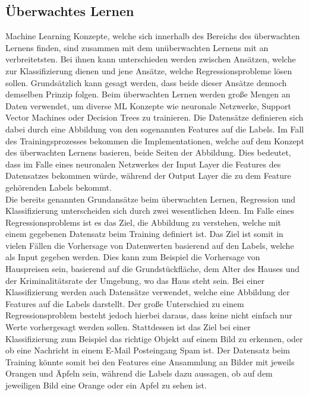 \documentclass[]{iat}
\begin{document}
\subsection{Überwachtes Lernen} \label{sec:ueberwachtes_lernen}
Machine Learning Konzepte, welche sich innerhalb des Bereichs des überwachten Lernens finden, sind zusammen mit dem unüberwachten Lernens mit an verbreitetsten. Bei ihnen kann unterschieden werden zwischen Ansätzen, welche zur Klassifizierung dienen und jene Ansätze, welche Regressionsprobleme lösen sollen. Grundsätzlich kann gesagt werden, dass beide dieser Ansätze dennoch demselben Prinzip folgen. Beim überwachten Lernen werden große Mengen an Daten verwendet, um diverse ML Konzepte wie neuronale Netzwerke, Support Vector Machines oder Decision Trees zu trainieren. Die Datensätze definieren sich dabei durch eine Abbildung von den sogenannten Features auf die Labels. Im Fall des Trainingsprozesses bekommen die Implementationen, welche auf dem Konzept des überwachten Lernens basieren, beide Seiten der Abbildung. Dies bedeutet, dass im Falle eines neuronalen Netzwerkes der Input Layer die Features des Datensatzes bekommen würde, während der Output Layer die zu dem Feature gehörenden Labels bekommt.\\
Die bereits genannten Grundansätze beim überwachten Lernen, Regression und Klassifizierung unterscheiden sich durch zwei wesentlichen Ideen. Im Falle eines Regressionsproblems ist es das Ziel, die Abbildung zu verstehen, welche mit einem gegebenen Datensatz beim Training definiert ist. Das Ziel ist somit in vielen Fällen die Vorhersage von Datenwerten basierend auf den Labels, welche als Input gegeben werden. Dies kann zum Beispiel die Vorhersage von Hauspreisen sein, basierend auf die Grundstückfläche, dem Alter des Hauses und der Kriminalitätsrate der Umgebung, wo das Haus steht sein. Bei einer Klassifizierung werden auch Datensätze verwendet, welche eine Abbildung der Features auf die Labels darstellt. Der große Unterschied zu einem Regressionsproblem besteht jedoch hierbei daraus, dass keine nicht einfach nur Werte vorhergesagt werden sollen. Stattdessen ist das Ziel bei einer Klassifizierung zum Beispiel das richtige Objekt auf einem Bild zu erkennen, oder ob eine Nachricht in einem E-Mail Posteingang Spam ist. Der Datensatz beim Training könnte somit bei den Features eine Ansammlung an Bilder mit jeweils Orangen und Äpfeln sein, während die Labels dazu aussagen, ob auf dem jeweiligen Bild eine Orange oder ein Apfel zu sehen ist. \cite[]{murphy2012machine} \cite[]{FrocMasc2021}
\end{document}
